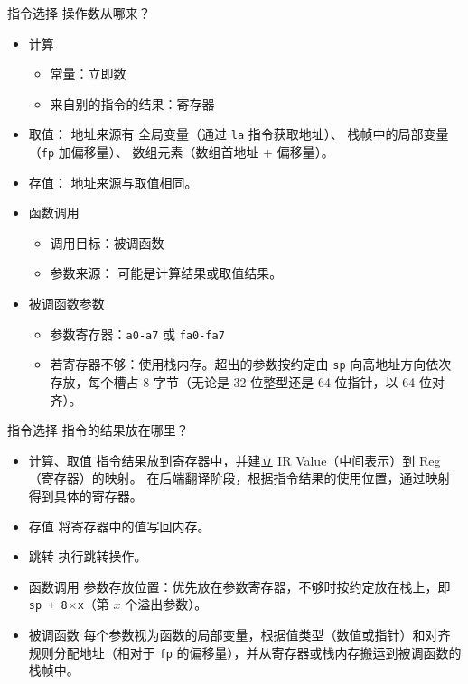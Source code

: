 \documentclass[12pt]{ctexbeamer}
\begin{document}
\begin{frame}{指令选择}
操作数从哪来？
\begin{itemize}
  \item 计算
    \begin{itemize}
      \item 常量：立即数
      \item 来自别的指令的结果：寄存器
    \end{itemize}
  \item 取值：
    地址来源有  
    全局变量（通过 \texttt{la} 指令获取地址）、  
    栈帧中的局部变量（\texttt{fp} 加偏移量）、  
    数组元素（数组首地址 + 偏移量）。
  \item 存值： 
    地址来源与取值相同。
  \item 函数调用
    \begin{itemize}
      \item 调用目标：被调函数
      \item 参数来源：  
        可能是计算结果或取值结果。
    \end{itemize}
  \item 被调函数参数
    \begin{itemize}
      \item 参数寄存器：\texttt{a0-a7} 或 \texttt{fa0-fa7}
      \item 若寄存器不够：使用栈内存。超出的参数按约定由 \texttt{sp} 向高地址方向依次存放，每个槽占 8 字节（无论是 32 位整型还是 64 位指针，以 64 位对齐）。
    \end{itemize}
\end{itemize}
\end{frame}

\begin{frame}{指令选择}
指令的结果放在哪里？
\begin{itemize}
  \item 计算、取值  
    指令结果放到寄存器中，并建立 IR Value（中间表示）到 Reg（寄存器）的映射。  
    在后端翻译阶段，根据指令结果的使用位置，通过映射得到具体的寄存器。  
  \item 存值  
    将寄存器中的值写回内存。
  \item 跳转  
    执行跳转操作。
  \item 函数调用  
    参数存放位置：优先放在参数寄存器，不够时按约定放在栈上，即 \texttt{sp + 8$\times$x}（第 $x$ 个溢出参数）。  
  \item 被调函数  
    每个参数视为函数的局部变量，根据值类型（数值或指针）和对齐规则分配地址（相对于 \texttt{fp} 的偏移量），并从寄存器或栈内存搬运到被调函数的栈帧中。
\end{itemize}
\end{frame}
\end{document}
